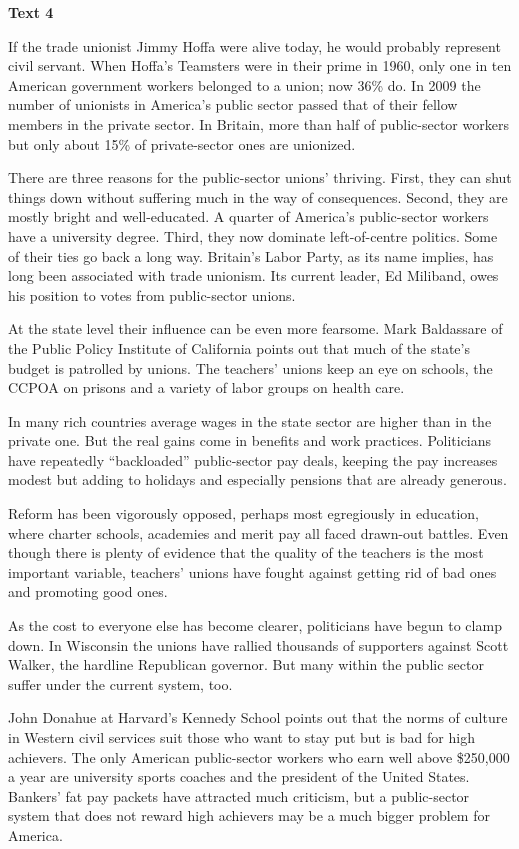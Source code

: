 \textbf{Text 4}

If the trade unionist Jimmy Hoffa were alive today, he would probably represent civil servant.
When Hoffa’s Teamsters were in their prime in 1960, only one in ten American government workers
belonged to a union; now 36\% do. In 2009 the number of unionists in America’s public sector 
passed that of their fellow members in the private sector. In Britain, more than half of public-sector 
workers but only about 15\% of private-sector ones are unionized.

There are three reasons for the public-sector unions’ thriving. First, they can shut things down without suffering much in the way of consequences. Second, they are mostly bright and well-educated. A quarter of America’s public-sector workers have a university degree. Third, they now dominate left-of-centre politics. Some of their ties go back a long way. Britain’s Labor Party, as its name implies, has long been associated with trade unionism. Its current leader, Ed Miliband, owes his position to votes from public-sector unions.

At the state level their influence can be even more fearsome. Mark Baldassare of the Public Policy Institute of California points out that much of the state’s budget is patrolled by unions. The teachers’ unions keep an eye on schools, the CCPOA on prisons and a variety of labor groups on health care.

In many rich countries average wages in the state sector are higher than in the private one. But the real gains come in benefits and work practices. Politicians have repeatedly “backloaded” public-sector pay deals, keeping the pay increases modest but adding to holidays and especially pensions that are already generous.

Reform has been vigorously opposed, perhaps most egregiously in education, where charter schools, academies and merit pay all faced drawn-out battles. Even though there is plenty of evidence that the quality of the teachers is the most important variable, teachers’ unions have fought against getting rid of bad ones and promoting good ones.

As the cost to everyone else has become clearer, politicians have begun to clamp down. In Wisconsin the unions have rallied thousands of supporters against Scott Walker, the hardline Republican governor. But many within the public sector suffer under the current system, too.

John Donahue at Harvard’s Kennedy School points out that the norms of culture in Western 
civil services suit those who want to stay put but is bad for high achievers. The only 
American public-sector workers who earn well above \$250,000 a year are university sports 
coaches and the president of the United States. Bankers’ fat pay packets have attracted 
much criticism, but a public-sector system that does not reward high achievers may be a 
much bigger problem for America.

